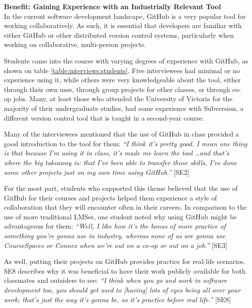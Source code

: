 \textbf{Benefit: Gaining Experience with an Industrially Relevant Tool} \\
In the current software development landscape, GitHub is a very popular tool for working collaboratively. As such, it is essential that developers are familiar with either GitHub or other distributed version control systems, particularly when working on collaborative, multi-person projects.

Students came into the course with varying degrees of experience with GitHub, as shown on table \ref{table:interviews:students}. Five interviewees had minimal or no experience using it, while others were very knowledgeable about the tool, either through their own uses, through group projects for other classes, or through co-op jobs. Many, at least those who attended the University of Victoria for the majority of their undergraduate studies, had some experience with Subversion, a different version control tool that is taught in a second-year course.

Many of the interviewees mentioned that the use of GitHub in class provided a good introduction to the tool for them: \textit{``I think it's pretty good. I mean one thing is that because I'm using it in class, it's made me learn the tool \ldots and that's where the big takeaway is: that I've been able to transfer those skills, I've done some other projects just on my own time using GitHub.''} [SE2]


For the most part, students who supported this theme believed that the use of GitHub for their courses and projects helped them experience a style of collaboration that they will encounter often in their careers. In comparison to the use of more traditional LMSes, one student noted why using GitHub might be advantageous for them: \textit{``Well, I like how it's the bonus of more practice of something you're gonna use in industry, whereas none of us are gonna use CourseSpaces or Connex when we're out on a co-op or out on a job.''} [SE3]

As well, putting their projects on GitHub provides practice for real-life scenarios. SE8 describes why it was beneficial to have their work publicly available for both classmates and outsiders to see: \textit{``I think when you go and work in software development too, you should get used to [having] lots of eyes being all over your work; that's just the way it's gonna be, so it's practice before real life.''} [SE8]

